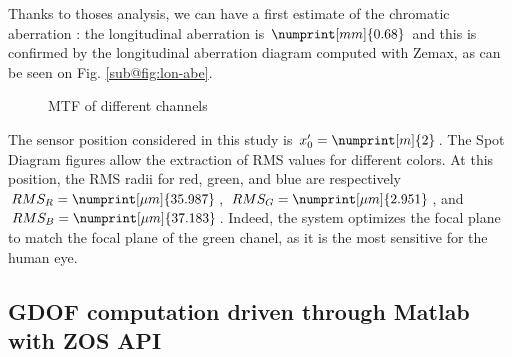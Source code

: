\documentclass[10pt,letterpaper]{article}
\begin{document}
Thanks to thoses analysis, we can have a first estimate of the chromatic aberration : the longitudinal aberration is $\numprint[mm]{0.68}$ and this is confirmed by the longitudinal aberration diagram computed with Zemax, as can be seen on Fig. \ref{sub@fig:lon-abe}.
\begin{figure}[h]
    \centering
	\caption{MTF of different channels}
    \label{fig:fft-colors}
\end{figure}

The sensor position considered in this study is $x'_0 = \numprint[m]{2}$. The Spot Diagram figures allow the extraction of RMS values for different colors. At this position, the RMS radii for red, green, and blue are respectively $RMS_R = \numprint[\mu m]{35.987}$, $RMS_G = \numprint[\mu m]{2.951}$, and $RMS_B = \numprint[\mu m]{37.183}$. Indeed, the system optimizes the focal plane to match the focal plane of the green chanel, as it is the most sensitive for the human eye.



\subsection{GDOF computation driven through Matlab with ZOS API}
\end{document}
